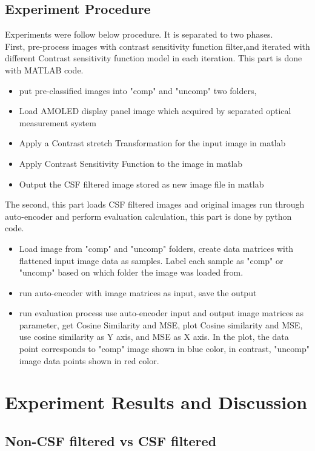\documentclass{article}
\begin{document}
\subsection{Experiment Procedure}
Experiments were follow below procedure. It is separated to two phases.\\
First, pre-process images with contrast sensitivity function filter,and iterated with different Contrast sensitivity function model in each iteration. This part is done with MATLAB code.
\begin{itemize}
    \item put pre-classified images into "comp" and "uncomp" two folders,
    \item Load AMOLED display panel image which acquired by separated optical measurement system
    \item Apply a Contrast stretch Transformation for the input image in matlab
    \item Apply Contrast Sensitivity Function to the image in matlab
    \item Output the CSF filtered image stored as new image file in matlab
\end{itemize}
The second, this part loads CSF filtered images and original images run through auto-encoder and perform evaluation calculation, this part is done by python code.
\begin{itemize}
    \item Load image from "comp" and "uncomp" folders, create data matrices with flattened input image data as samples. Label each sample as "comp" or "uncomp" based on which folder the image was loaded from.
    \item run auto-encoder with image matrices as input, save the output
    \item run evaluation process use auto-encoder input and output image matrices as parameter, get Cosine Similarity and MSE, plot Cosine similarity and MSE, use cosine similarity as Y axis, and MSE as X axis. In the plot, the data point corresponds to "comp" image shown in blue color, in contrast, "uncomp" image data points shown in red color.
\end{itemize}

\section{Experiment Results and Discussion}
\subsection{Non-CSF filtered vs CSF filtered}
\end{document}
